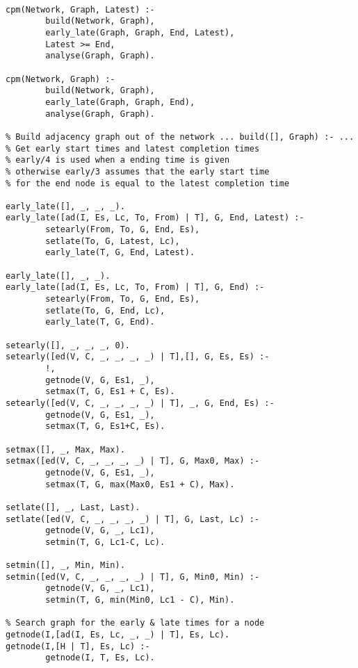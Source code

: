 
\begin{verbatim}

cpm(Network, Graph, Latest) :-
        build(Network, Graph),
        early_late(Graph, Graph, End, Latest),
        Latest >= End,
        analyse(Graph, Graph).
        
cpm(Network, Graph) :-
        build(Network, Graph),
        early_late(Graph, Graph, End),
        analyse(Graph, Graph).

% Build adjacency graph out of the network ... build([], Graph) :- ...
% Get early start times and latest completion times
% early/4 is used when a ending time is given
% otherwise early/3 assumes that the early start time
% for the end node is equal to the latest completion time

early_late([], _, _, _).
early_late([ad(I, Es, Lc, To, From) | T], G, End, Latest) :-
        setearly(From, To, G, End, Es),
        setlate(To, G, Latest, Lc),
        early_late(T, G, End, Latest).

early_late([], _, _).
early_late([ad(I, Es, Lc, To, From) | T], G, End) :-
        setearly(From, To, G, End, Es),
        setlate(To, G, End, Lc),
        early_late(T, G, End).

setearly([], _, _, _, 0).
setearly([ed(V, C, _, _, _, _) | T],[], G, Es, Es) :-
        !,
        getnode(V, G, Es1, _),
        setmax(T, G, Es1 + C, Es).
setearly([ed(V, C, _, _, _, _) | T], _, G, End, Es) :-
        getnode(V, G, Es1, _),
        setmax(T, G, Es1+C, Es).

setmax([], _, Max, Max).
setmax([ed(V, C, _, _, _, _) | T], G, Max0, Max) :-
        getnode(V, G, Es1, _),
        setmax(T, G, max(Max0, Es1 + C), Max).

setlate([], _, Last, Last).
setlate([ed(V, C, _, _, _, _) | T], G, Last, Lc) :-
        getnode(V, G, _, Lc1),
        setmin(T, G, Lc1-C, Lc).

setmin([], _, Min, Min).
setmin([ed(V, C, _, _, _, _) | T], G, Min0, Min) :-
        getnode(V, G, _, Lc1),
        setmin(T, G, min(Min0, Lc1 - C), Min).

% Search graph for the early & late times for a node
getnode(I,[ad(I, Es, Lc, _, _) | T], Es, Lc).
getnode(I,[H | T], Es, Lc) :-
        getnode(I, T, Es, Lc).


\end{verbatim}
